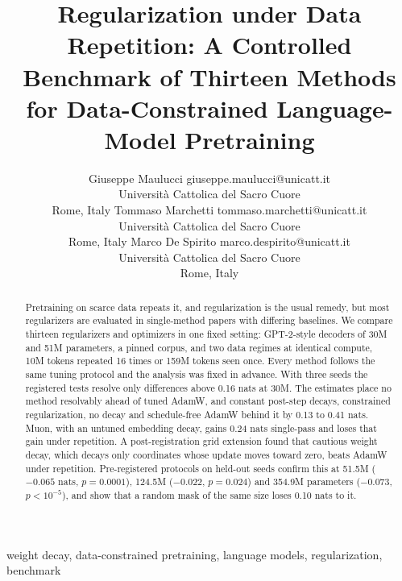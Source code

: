 \documentclass[twoside,11pt]{article}
\begin{document}
\title{Regularization under Data Repetition: A Controlled Benchmark of Thirteen Methods for Data-Constrained Language-Model Pretraining}

\author{\name Giuseppe Maulucci \email giuseppe.maulucci@unicatt.it \\
       \addr Universit\`a Cattolica del Sacro Cuore\\
       Rome, Italy
       \AND
       \name Tommaso Marchetti \email tommaso.marchetti@unicatt.it \\
       \addr Universit\`a Cattolica del Sacro Cuore\\
       Rome, Italy
       \AND
       \name Marco De Spirito \email marco.despirito@unicatt.it \\
       \addr Universit\`a Cattolica del Sacro Cuore\\
       Rome, Italy}

\editor{}

\maketitle

\begin{abstract}%
Pretraining on scarce data repeats it, and regularization is the usual remedy, but most regularizers are evaluated in single-method papers with differing baselines. We compare thirteen regularizers and optimizers in one fixed setting: GPT-2-style decoders of 30M and 51M parameters, a pinned corpus, and two data regimes at identical compute, 10M tokens repeated 16 times or 159M tokens seen once. Every method follows the same tuning protocol and the analysis was fixed in advance. With three seeds the registered tests resolve only differences above 0.16 nats at 30M. The estimates place no method resolvably ahead of tuned AdamW, and constant post-step decays, constrained regularization, no decay and schedule-free AdamW behind it by 0.13 to 0.41 nats. Muon, with an untuned embedding decay, gains 0.24 nats single-pass and loses that gain under repetition. A post-registration grid extension found that cautious weight decay, which decays only coordinates whose update moves toward zero, beats AdamW under repetition. Pre-registered protocols on held-out seeds confirm this at 51.5M ($-0.065$ nats, $p = 0.0001$), 124.5M ($-0.022$, $p = 0.024$) and 354.9M parameters ($-0.073$, $p < 10^{-5}$), and show that a random mask of the same size loses 0.10 nats to it.
\end{abstract}

\begin{keywords}
weight decay, data-constrained pretraining, language models, regularization, benchmark
\end{keywords}
\end{document}

